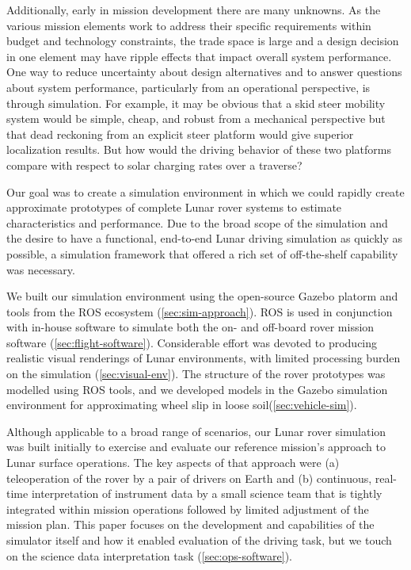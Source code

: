 \documentclass[twocolumn,letterpaper]{IEEEAerospaceCLS}  %
\begin{document}

Additionally, early in mission development there are many unknowns.
As the various mission elements work to address their specific requirements within budget and technology constraints, the trade space is large and a design decision in one element may have ripple effects that impact overall system performance. 
One way to reduce uncertainty about design alternatives and to answer questions about system performance, particularly from an operational perspective, is through simulation. 
For example, it may be obvious that a skid steer mobility system would be simple, cheap, and robust from a mechanical perspective but that dead reckoning from an explicit steer platform would give superior localization results. 
But how would the driving behavior of these two platforms compare with respect to solar charging rates over a traverse? 

Our goal was to create a simulation environment in which we could rapidly create approximate prototypes of complete Lunar rover systems to estimate characteristics and performance. 
Due to the broad scope of the simulation and the desire to have a functional, end-to-end Lunar driving simulation as quickly as possible, a simulation framework that offered a rich set of off-the-shelf capability was necessary. 

We built our simulation environment using the open-source Gazebo platorm and tools from the ROS ecosystem (\cref{sec:sim-approach}). 
ROS is used in conjunction with in-house software to simulate both the on- and off-board rover mission software (\cref{sec:flight-software}).  
Considerable effort was devoted to producing realistic visual renderings of Lunar environments, with limited processing burden on the simulation (\cref{sec:visual-env}).  
The structure of the rover prototypes was modelled using ROS tools, and we developed models in the Gazebo simulation environment for approximating wheel slip in loose soil(\cref{sec:vehicle-sim}).  

Although applicable to a broad range of scenarios, our Lunar rover simulation was built initially to exercise and evaluate our reference mission's approach to Lunar surface operations.
The key aspects of that approach were (a) teleoperation of the rover by a pair of drivers on Earth and (b) continuous, real-time interpretation of instrument data by a small science team that is tightly integrated within mission operations followed by limited adjustment of the mission plan.
This paper focuses on the development and capabilities of the simulator itself and how it enabled evaluation of the driving task, but we touch on the science data interpretation task (\cref{sec:ops-software}).
\end{document}
